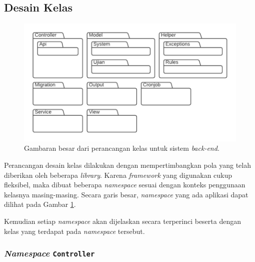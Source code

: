 \subsection{Desain Kelas}
    \begin{figure}
        \centering
        \includegraphics{Gambar/classmap-be/Classmap - Overview.pdf}
        \caption{Gambaran besar dari perancangan kelas untuk sistem
        \textit{back-end}.}
        \label{fig:classmap_overview}
    \end{figure}
    Perancangan desain kelas dilakukan dengan mempertimbangkan pola yang telah
    diberikan oleh beberapa \textit{library}. Karena \textit{framework} yang
    digunakan cukup fleksibel, maka dibuat beberapa \textit{namespace} sesuai
    dengan konteks penggunaan kelasnya masing-masing. Secara garis besar,
    \textit{namespace} yang ada aplikasi dapat dilihat pada Gambar
    \ref{fig:classmap_overview}.
    
    Kemudian setiap \textit{namespace} akan dijelaskan secara terperinci beserta
    dengan kelas yang terdapat pada \textit{namespace} tersebut.

\subsubsection{\textit{Namespace} \texttt{Controller}}
    
